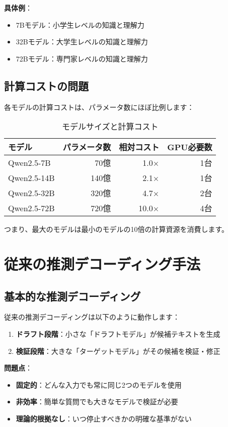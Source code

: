 \documentclass[a4paper,12pt]{jsarticle}
\begin{document}
\textbf{具体例}：
\begin{itemize}
\item 7Bモデル：小学生レベルの知識と理解力
\item 32Bモデル：大学生レベルの知識と理解力  
\item 72Bモデル：専門家レベルの知識と理解力
\end{itemize}

\subsection{計算コストの問題}

各モデルの計算コストは、パラメータ数にほぼ比例します：

\begin{table}[H]
\centering
\caption{モデルサイズと計算コスト}
\begin{tabular}{|l|r|r|r|}
\hline
\textbf{モデル} & \textbf{パラメータ数} & \textbf{相対コスト} & \textbf{GPU必要数} \\
\hline
Qwen2.5-7B & 70億 & 1.0× & 1台 \\
Qwen2.5-14B & 140億 & 2.1× & 1台 \\
Qwen2.5-32B & 320億 & 4.7× & 2台 \\
Qwen2.5-72B & 720億 & 10.0× & 4台 \\
\hline
\end{tabular}
\end{table}

つまり、最大のモデルは最小のモデルの10倍の計算資源を消費します。

\section{従来の推測デコーディング手法}

\subsection{基本的な推測デコーディング}

従来の推測デコーディングは以下のように動作します：

\begin{enumerate}
\item \textbf{ドラフト段階}：小さな「ドラフトモデル」が候補テキストを生成
\item \textbf{検証段階}：大きな「ターゲットモデル」がその候補を検証・修正
\end{enumerate}

\textbf{問題点}：
\begin{itemize}
\item \textbf{固定的}：どんな入力でも常に同じ2つのモデルを使用
\item \textbf{非効率}：簡単な質問でも大きなモデルで検証が必要
\item \textbf{理論的根拠なし}：いつ停止すべきかの明確な基準がない
\end{itemize}
\end{document}

